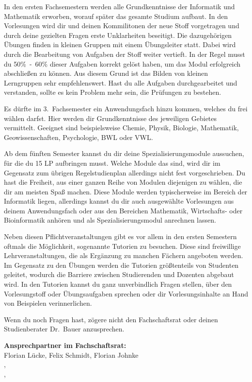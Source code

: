 In den ersten Fachsemestern werden alle Grundkenntnisse der Informatik und Mathematik erworben, worauf später das gesamte Studium aufbaut.
In den Vorlesungen wird dir und deinen Kommilitonen der neue Stoff vorgetragen und durch deine gezielten Fragen erste Unklarheiten beseitigt.
Die dazugehörigen Übungen finden in kleinen Gruppen mit einem Übungsleiter statt.
Dabei wird durch die Bearbeitung von Aufgaben der Stoff weiter vertieft.
In der Regel musst du 50\%~-~60\% dieser Aufgaben korrekt gelöst haben, um das Modul erfolgreich abschließen zu können.
Aus diesem Grund ist das Bilden von kleinen Lerngruppen sehr empfehlenswert.
Hast du alle Aufgaben durchgearbeitet und verstanden, sollte es kein Problem mehr sein, die Prüfungen zu bestehen.

Es dürfte im 3.~Fachsemester ein Anwendungsfach hinzu kommen, welches du frei wählen darfst.
Hier werden dir Grundkenntnisse des jeweiligen Gebietes vermittelt.
Geeignet sind beispielsweise Chemie, Physik, Biologie, Mathematik, Geowissenschaften, Psychologie, BWL oder VWL.

Ab dem fünften Semester kannst du dir deine Spezialisierungsmodule aussuchen, für die du 15 LP aufbringen musst.
Welche Module das sind, wird dir im Gegensatz zum übrigen Regelstudienplan allerdings nicht fest vorgeschrieben.
Du hast die Freiheit, aus einer ganzen Reihe von Modulen diejenigen zu wählen, die dir am meisten Spaß machen.
Diese Module werden typischerweise im Bereich der Informatik liegen, allerdings kannst du dir auch ausgewählte Vorlesungen aus deinem Anwendungsfach oder aus den Bereichen Mathematik, Wirtschafts- oder Bioinformatik anhören und als Spezialisierungsmodul anrechnen lassen.

Neben diesen Pflichtveranstaltungen gibt es vor allem in den ersten Semestern oftmals die Möglichkeit, sogenannte Tutorien zu besuchen.
Diese sind freiwillige Lehrveranstaltungen, die als Ergänzung zu manchen Fächern angeboten werden.
Im Gegensatz zu den Übungen werden die Tutorien größtenteils von Studenten geleitet, wodurch die Barriere zwischen Studierenden und Dozenten abgebaut wird.
In den Tutorien kannst du ganz unverbindlich Fragen stellen, über den Vorlesungstoff oder Übungsaufgaben sprechen oder dir Vorlesungsinhalte an Hand von Beispielen verinnerlichen.

Wenn du noch Fragen hast, zögere nicht den Fachschaftsrat oder deinen Studienberater Dr.~Bauer anzusprechen.

\textbf{Ansprechpartner im Fachschaftsrat:}\\
Florian Lücke, Felix Schmidt, Florian Johnke\\
,\\
,\\
\\

